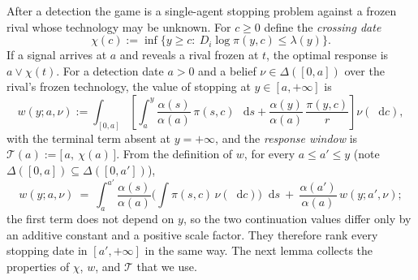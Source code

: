 \documentclass[12pt,reqno]{article}
\newcommand{\de}{\mathop{}\!\mathrm{d}}
\theoremstyle{definition} \newtheorem{example}{Example}
\theoremstyle{definition} \newtheorem{condition}{Condition}
\theoremstyle{definition} \newtheorem{corollary}{Corollary}
\theoremstyle{definition} \newtheorem{claim}{Claim}
\theoremstyle{definition} \newtheorem{definition}{Definition}
\theoremstyle{definition} \newtheorem{conjecture}{Conjecture}
\theoremstyle{definition} \newtheorem{Lemma}{Lemma}
\theoremstyle{definition} \newtheorem{lemma}{Lemma}
\theoremstyle{plain} \newtheorem{theorem}{Theorem}
\theoremstyle{definition} \newtheorem{assumption}{Assumption}
\theoremstyle{definition} \newtheorem*{assumptionnonumber}{Assumption}
\theoremstyle{definition} \newtheorem*{theoremNoNumber}{Proposition}
\theoremstyle{definition}
\theoremstyle{definition}\newtheorem{proposition}{Proposition}
\theoremstyle{definition} \newtheorem{result}{Result}
\theoremstyle{definition} \newtheorem*{definitionNoNumber}{Definition}
\theoremstyle{definition} \newtheorem{Definition}{Definition}
\theoremstyle{definition} \newtheorem*{DefinitionNoNumber}{Definition}
\theoremstyle{definition} \newtheorem*{fact}{Fact}
\theoremstyle{definition} \newtheorem*{property}{Property}
\theoremstyle{definition} \newtheorem{remark}{Remark}
\begin{document}
After a detection the game is a single-agent stopping problem against a frozen rival whose technology may be unknown. For $c\ge0$ define the \emph{crossing date}
\[
\chi(c):=\inf\big\{y\ge c:\ D_i\log\pi(y,c)\le\lambda(y)\big\}.
\]
If a signal arrives at $a$ and reveals a rival frozen at $t$, the optimal response is $a\vee\chi(t)$. For a detection date $a>0$ and a belief $\nu\in\Delta([0,a])$ over the rival's frozen technology, the value of stopping at $y\in[a,+\infty]$ is
\[
w(y;a,\nu):=\int_{[0,a]}\left[\int_a^y \frac{\alpha(s)}{\alpha(a)}\,\pi(s,c)\,\de s+\frac{\alpha(y)}{\alpha(a)}\,\frac{\pi(y,c)}{r}\right]\nu(\de c),
\]
with the terminal term absent at $y=+\infty$, and the \emph{response window} is
$
\mathcal{T}(a):=\big[\,a,\ \chi(a)\,\big].
$
From the definition of $w$, for every $a\le a'\le y$ (note $\Delta([0,a])\subseteq\Delta([0,a'])$),
\begin{equation}\label{eq:ex-split}
w(y;a,\nu)\ =\ \int_a^{a'}\frac{\alpha(s)}{\alpha(a)}\Big(\int\pi(s,c)\,\nu(\de c)\Big)\de s\ +\ \frac{\alpha(a')}{\alpha(a)}\,w(y;a',\nu);
\end{equation}
the first term does not depend on $y$, so the two continuation values differ only by an additive constant and a positive scale factor. They therefore rank every stopping date in $[a',+\infty]$ in the same way. The next lemma collects the properties of $\chi$, $w$, and $\mathcal{T}$ that we use.
\end{document}
